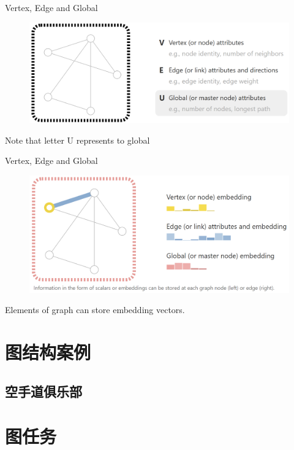 \documentclass{beamer}
\begin{document}
\begin{frame}{Vertex, Edge and Global}
    \begin{figure}
        \includegraphics[width=\textwidth]{global.png}
    \end{figure}
    Note that letter U represents to global
\end{frame}

\begin{frame}{Vertex, Edge and Global}
    \begin{figure}
        \includegraphics[width=\textwidth]{graph.png}
    \end{figure}
    Elements of graph can store embedding vectors.
\end{frame}

\section{图结构案例}

\subsection{空手道俱乐部}

\begin{frame}

\end{frame}

\section{图任务}
\end{document}
